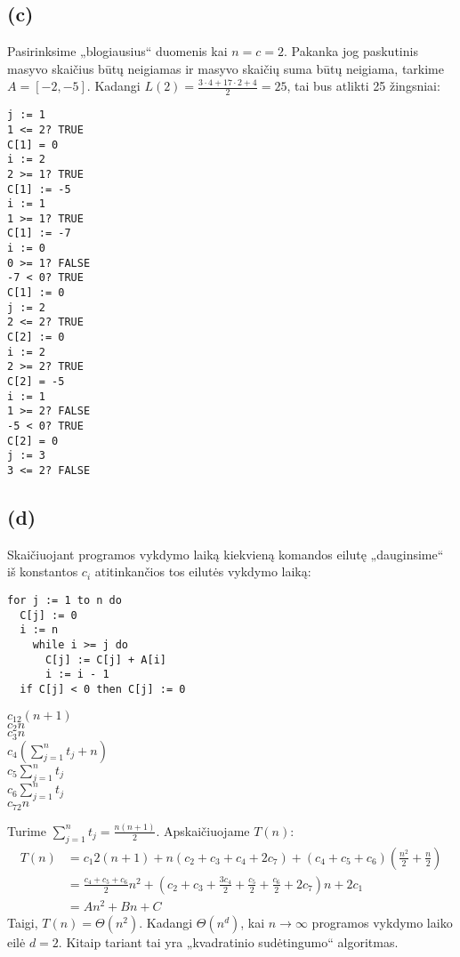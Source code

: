 \documentclass[a4paper,lithuanian]{article}
\begin{document}
\subsection*{(c)}
Pasirinksime „blogiausius“ duomenis kai $n = c = 2$. Pakanka jog paskutinis masyvo skaičius būtų neigiamas ir masyvo skaičių suma būtų neigiama, tarkime $A = [-2, -5]$.
Kadangi $L(2) = \frac{3\cdot{4}+17\cdot{2}+4}{2}=25$, tai bus atlikti 25 žingsniai:
\begin{lstlisting}
j := 1
1 <= 2? TRUE
C[1] = 0
i := 2
2 >= 1? TRUE
C[1] := -5
i := 1
1 >= 1? TRUE
C[1] := -7
i := 0
0 >= 1? FALSE
-7 < 0? TRUE
C[1] := 0
j := 2
2 <= 2? TRUE
C[2] := 0
i := 2
2 >= 2? TRUE
C[2] = -5
i := 1
1 >= 2? FALSE
-5 < 0? TRUE
C[2] = 0
j := 3
3 <= 2? FALSE
\end{lstlisting}
\subsection*{(d)}
Skaičiuojant programos vykdymo laiką kiekvieną komandos eilutę „dauginsime“ iš konstantos $c_i$ atitinkančios tos eilutės vykdymo laiką:
\begin{multicols}{2}
  \begin{lstlisting}
for j := 1 to n do
  C[j] := 0
  i := n
    while i >= j do
      C[j] := C[j] + A[i]
      i := i - 1
  if C[j] < 0 then C[j] := 0
  \end{lstlisting}
  \columnbreak
  $c_12(n+1)$\\
  $c_2n$\\
  $c_3n$\\
  $c_4(\sum_{j=1}^{n}t_j + n)$\\
  $c_5\sum_{j=1}^{n}t_j$\\
  $c_6\sum_{j=1}^{n}t_j$\\
  $c_72n$\\
\end{multicols}
Turime $\sum_{j=1}^{n}t_j=\frac{n(n+1)}{2}$. Apskaičiuojame $T(n)$:
\begin{equation}
  \begin{aligned}
    T(n) &= c_{1}2(n+1)+n(c_2+c_3+c_4+2c_7)+(c_4+c_5+c_6)(\frac{n^2}{2}+\frac{n}{2})\\
         &= \frac{c_4+c_5+c_6}{2}n^2 + (c_2 + c_3 + \frac{3c_4}{2} + \frac{c_5}{2} + \frac{c_6}{2} + 2c_7)n + 2c_1\\
         &= An^2 + Bn + C
  \end{aligned}
\end{equation}
Taigi, $T(n) = \Theta{(n^2)}$. Kadangi $\Theta{}(n^d)$, kai $n\rightarrow{}\infty{}$ programos vykdymo laiko eilė $d = 2$. Kitaip tariant tai yra „kvadratinio sudėtingumo“ algoritmas.
\end{document}
